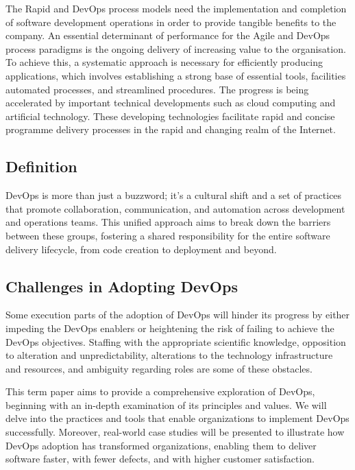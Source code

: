\documentclass[12pt, letterpaper]{article}
\begin{document}
The Rapid and DevOps process models need the implementation and completion of software development operations in order to provide tangible benefits to the company.  An essential determinant of performance for the Agile and DevOps process paradigms is the ongoing delivery of increasing value to the organisation\cite{article}.  To achieve this, a systematic approach is necessary for efficiently producing applications, which involves establishing a strong base of essential tools, facilities automated processes, and streamlined procedures.  The progress is being accelerated by important technical developments such as cloud computing and artificial technology.  These developing technologies facilitate rapid and concise programme delivery processes in the rapid and changing realm of the Internet\cite{Kang}.  

\subsection{Definition}
DevOps is more than just a buzzword; it's a cultural shift and a set of practices that promote collaboration, communication, and automation across development and operations teams. This unified approach aims to break down the barriers between these groups, fostering a shared responsibility for the entire software delivery lifecycle, from code creation to deployment and beyond\cite{Subramanya}.

\subsection{Challenges in Adopting DevOps}
Some execution parts of the adoption of DevOps will hinder its progress by either impeding the DevOps enablers or heightening the risk of failing to achieve the DevOps objectives. Staffing with the appropriate scientific knowledge, opposition to alteration and unpredictability, alterations to the technology infrastructure and resources, and ambiguity regarding roles are some of these obstacles\cite{FerreiraLeite}.

This term paper aims to provide a comprehensive exploration of DevOps, beginning with an in-depth examination of its principles and values. We will delve into the practices and tools that enable organizations to implement DevOps successfully. Moreover, real-world case studies will be presented to illustrate how DevOps adoption has transformed organizations, enabling them to deliver software faster, with fewer defects, and with higher customer satisfaction\cite{Leite_2019}.
\end{document}
